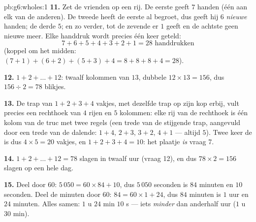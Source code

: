 \begin{solution}{pb:g6:wholes:1}
\textbf{11.} Zet de vrienden op een rij. De eerste geeft $7$ handen (één aan
elk van de anderen). De tweede heeft de eerste al begroet, dus geeft hij $6$
\emph{nieuwe} handen; de derde $5$; en zo verder, tot de zevende er $1$ geeft
en de achtste geen nieuwe meer. Elke handdruk wordt precies één keer geteld:
\[
7 + 6 + 5 + 4 + 3 + 2 + 1 = 28 \text{ handdrukken}
\]
(koppel om het midden: $(7+1) + (6+2) + (5+3) + 4 = 8 + 8 + 8 + 4 = 28$).

\textbf{12.} $1 + 2 + \dots + 12$: twaalf kolommen van $13$, dubbele 
$12 \times 13 = 156$, dus $156 \div 2 = 78$ blikjes.

\textbf{13.} De trap van $1 + 2 + 3 + 4$ vakjes, met dezelfde trap op zijn kop
erbij, vult precies een rechthoek van $4$ rijen en $5$ kolommen: elke rij van
de rechthoek is één kolom van de truc met twee regels (een trede van de
stijgende trap, aangevuld door een trede van de dalende: $1 + 4$, $2 + 3$,
$3 + 2$, $4 + 1$ --- altijd $5$). Twee keer de  is dus $4 \times 5 = 20$
vakjes, en $1 + 2 + 3 + 4 = 10$: het plaatje \emph{is} vraag 7.

\textbf{14.} $1 + 2 + \dots + 12 = 78$ slagen in twaalf uur (vraag 12), en dus
$78 \times 2 = 156$ slagen op een hele dag.

\textbf{15.} Deel door $60$: $5\,050 = 60 \times 84 + 10$, dus $5\,050$
seconden is $84$ minuten en $10$ seconden. Deel de minuten door $60$:
$84 = 60 \times 1 + 24$, dus $84$ minuten is $1$ uur en $24$ minuten. Alles
samen: $1$ u $24$ min $10$ s --- iets \emph{minder} dan anderhalf uur ($1$ u
$30$ min).
\end{solution}

